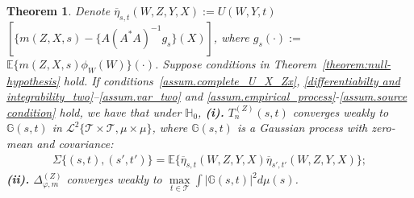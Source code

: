 \documentclass[
  12pt]{article}
\newtheorem{theorem}{Theorem}
\def\mH{\mathbb{H}}
\def\cT{\mathcal{T}}
\begin{document}
\begin{theorem}\label{theorem:null-hypothesis_two}
Denote $\overline{\eta}_{s,t}(W,Z,Y,X) :=U(W,Y,t)$ $\left[\{m(Z,X,s) - \{A(A^*A)^{-1}g_{s}\}(X)\right]$, where $g_{s}(\cdot):=$ $\mathbb{E}\{m(Z,X,s)\phi_W(W)\}(\cdot)$. Suppose conditions in Theorem~\ref{theorem:null-hypothesis} hold. If conditions~\ref{assum.complete_U_X_Zx}, \ref{differentiabilty and integrability_two}--\ref{assum.var_two} and \ref{assum.empirical_process}-\ref{assum.source condition} hold, we have that under $\mH_0$, \textbf{(i).} $T^{(Z)}_n(s,t)$ converges weakly to $\mathbb{G}(s,t)$ in $\mathcal{L}^{2}\{\mathcal{T}\times\mathcal{T},\mu\times\mu\}$, where $\mathbb{G}(s,t)$ is a Gaussian process with zero-mean and covariance:
\begin{align*}
    \Sigma\{(s,t),(s',t')\} =\mathbb{E}\{\overline{\eta}_{s,t}(W,Z,Y,X)\overline{\eta}_{s',t'}(W,Z,Y,X)\};
\end{align*}
\textbf{(ii).} $\Delta^{(Z)}_{\varphi,m}$ converges weakly to $\underset{t\in \cT}{\max}\int{| \mathbb{G}(s,t)|^2d\mu(s)}$.
\end{theorem}
\end{document}

